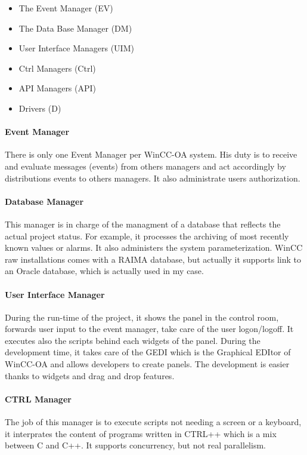 \documentclass[../main.tex]{subfiles}
\begin{document}
\begin{itemize}
    \item The Event Manager (EV)
    \item The Data Base Manager (DM)
    \item User Interface Managers (UIM)
    \item Ctrl Managers (Ctrl)
    \item API Managers (API)
    \item Drivers (D)
\end{itemize}

\paragraph{Event Manager}
There is only one Event Manager per WinCC-OA system. His duty is to receive and evaluate messages (events) from others managers and act accordingly by distributions events to others managers.
It also administrate users authorization.

\paragraph{Database Manager}
This manager is in charge of the managment of a database that reflects the actual project status. For example, it processes the archiving of most recently known values or alarms. It also administers the system parameterization.
WinCC raw installations comes with a RAIMA database, but actually it supports link to an Oracle database, which is actually used in my case.

\paragraph{User Interface Manager}
During the run-time of the project, it shows the panel in the control room, forwards user input to the event manager, take care of the user logon/logoff. It executes also the scripts behind each widgets of the panel.
During the development time, it takes care of the GEDI which is the Graphical EDItor of WinCC-OA and allows developers to create panels. The development is easier thanks to widgets and drag and drop features.

\paragraph{CTRL Manager}
The job of this manager is to execute scripts not needing a screen or a keyboard, it interprates the content of programs written in CTRL++ which is a mix between C and C++. It supports concurrency, but not real parallelism.
\end{document}
